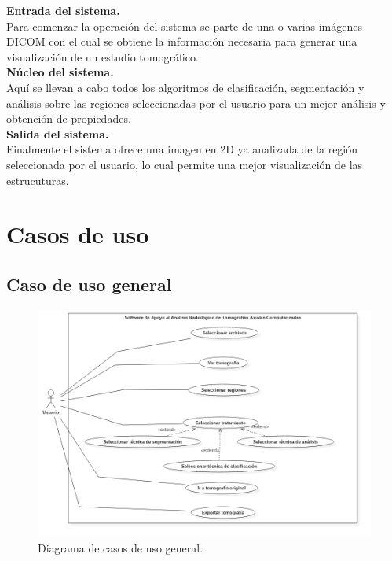 \documentclass[12pt]{report}
\begin{document}
\textbf{Entrada del sistema.}\\ Para comenzar la operación del sistema se parte de una o varias imágenes DICOM con el cual se obtiene la información necesaria para generar una visualización de un estudio tomográfico.\\

\textbf{Núcleo del sistema.}\\ Aquí se llevan a cabo todos los algoritmos de clasificación, segmentación y análisis sobre las regiones seleccionadas por el usuario para un mejor análisis y obtención de propiedades.\\

\textbf{Salida del sistema.}\\ Finalmente el sistema ofrece una imagen en 2D ya analizada de la región seleccionada  por el usuario, lo cual permite una mejor visualización de las estrucuturas.\\

\section{Casos de uso}
\subsection{Caso de uso general}

\begin{figure}[H]
\centering
\includegraphics[width = 11 cm, height =  13 cm]{MainCasos}
\caption{Diagrama de casos de uso general.}
\end{figure}
\end{document}

